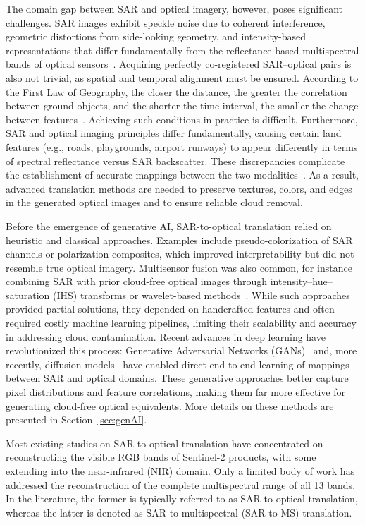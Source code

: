 The domain gap between SAR and optical imagery, however, poses significant challenges. SAR images exhibit speckle noise due to coherent interference, geometric distortions from side-looking geometry, and intensity-based representations that differ fundamentally from the reflectance-based multispectral bands of optical sensors~\cite{sar2opt_cGAN_Optim_oppr_limits}. Acquiring perfectly co-registered SAR–optical pairs is also not trivial, as spatial and temporal alignment must be ensured. According to the First Law of Geography, the closer the distance, the greater the correlation between ground objects, and the shorter the time interval, the smaller the change between features~\cite{sar_2_opt_CGAN_survey_taxonomy}. Achieving such conditions in practice is difficult. Furthermore, SAR and optical imaging principles differ fundamentally, causing certain land features (e.g., roads, playgrounds, airport runways) to appear differently in terms of spectral reflectance versus SAR backscatter. These discrepancies complicate the establishment of accurate mappings between the two modalities~\cite{sar_2_opt_CGAN_survey_taxonomy}. As a result, advanced translation methods are needed to preserve textures, colors, and edges in the generated optical images and to ensure reliable cloud removal.

Before the emergence of generative AI, SAR-to-optical translation relied on heuristic and classical approaches. Examples include pseudo-colorization of SAR channels or polarization composites, which improved interpretability but did not resemble true optical imagery. Multisensor fusion was also common, for instance combining SAR with prior cloud-free optical images through intensity–hue–saturation (IHS) transforms or wavelet-based methods~\cite{IHS_wavelet_Zhang2019}. While such approaches provided partial solutions, they depended on handcrafted features and often required costly machine learning pipelines, limiting their scalability and accuracy in addressing cloud contamination. Recent advances in deep learning have revolutionized this process: Generative Adversarial Networks (GANs)~\cite{GANs_Goodfellow} and, more recently, diffusion models~\cite{DDPM_2020} have enabled direct end-to-end learning of mappings between SAR and optical domains. These generative approaches better capture pixel distributions and feature correlations, making them far more effective for generating cloud-free optical equivalents. More details on these methods are presented in Section~\ref{sec:genAI}.

Most existing studies on SAR-to-optical translation have concentrated on reconstructing the visible RGB bands of Sentinel-2 products, with some extending into the near-infrared (NIR) domain. Only a limited body of work has addressed the reconstruction of the complete multispectral range of all 13 bands. In the literature, the former is typically referred to as SAR-to-optical translation, whereas the latter is denoted as SAR-to-multispectral (SAR-to-MS) translation. 


